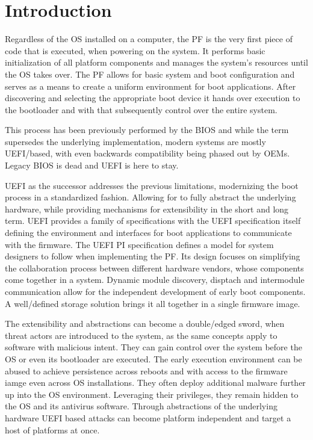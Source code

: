 

\chapter{Introduction}


Regardless of the \ac{OS} installed on a computer, the \ac{PF} is the very first piece of code that is executed, when powering on the system.
It performs basic initialization of all platform components and manages the system's resources until the \ac{OS} takes over.
The \ac{PF} allows for basic system and boot configuration and serves as a means to create a uniform environment for boot applications.
After discovering and selecting the appropriate boot device it hands over execution to the bootloader and with that subsequently control over the entire system.

This process has been previously performed by the \ac{BIOS} and while the term supersedes the underlying implementation, modern systems are mostly \ac{UEFI}\-/based, with even backwards compatibility being phased out by \acp{OEM}.
Legacy \ac{BIOS} is dead and \ac{UEFI} is here to stay.

\ac{UEFI} as the successor addresses the previous limitations, modernizing the boot process in a standardized fashion.
Allowing for to fully abstract the underlying hardware, while providing mechanisms for extensibility in the short and long term.
\ac{UEFI} provides a family of specifications with the \ac{UEFI} specification itself defining the environment and interfaces for boot applications to communicate with the firmware.
The \ac{UEFI} \ac{PI} specification defines a model for system designers to follow when implementing the \ac{PF}.
Its design focuses on simplifying the collaboration process between different hardware vendors, whose components come together in a system.
Dynamic module discovery, disptach and intermodule communication allow for the independent development of early boot components.
A well\-/defined storage solution brings it all together in a single firmware image.

The extensibility and abstractions can become a double\-/edged sword, when threat actors are introduced to the system, as the same concepts apply to software with malicious intent.
They can gain control over the system before the \ac{OS} or even its bootloader are executed.
The early execution environment can be abused to achieve persistence across reboots and with access to the firmware iamge even across \ac{OS} installations.
They often deploy additional malware further up into the \ac{OS} environment.
Leveraging their privileges, they remain hidden to the \ac{OS} and its antivirus software.
Through abstractions of the underlying hardware \ac{UEFI} based attacks can become platform independent and target a host of platforms at once.

